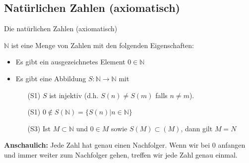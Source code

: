 \documentclass[12pt%
,aspectratio=169%
]{beamer}
\begin{document}
\subsection{Natürlichen Zahlen (axiomatisch)}
\begin{frame}{Die natürlichen Zahlen (axiomatisch)}
\begin{definition}
$\mathbb{N}$ ist eine Menge von Zahlen mit den folgenden Eigenschaften:
\begin{itemize}
	\item Es gibt ein ausgezeichnetes Element $0 \in \mathbb{N}$
	\item Es gibt eine Abbildung $S : \mathbb{N} \to \mathbb{N}$ mit
	\begin{itemize}
		\item[(S1)] $S$ ist injektiv (d.h. $S(n) \neq  S(m)$ falls $n \neq m$).
		\item[(S1)] $0 \not \in S(\mathbb{N}) = \{S(n) | n \in \mathbb{N}\}$
		\item[(S3)] Ist $M \subset \mathbb{N}$ und $0 \in M$ sowie $S(M) \subset (M)$, dann gilt $M = N$
	\end{itemize}
\end{itemize}
\end{definition}
\textbf{Anschaulich:} Jede Zahl hat genau einen Nachfolger. Wenn wir bei $0$ anfangen und immer weiter zum Nachfolger gehen, treffen wir jede Zahl genau einmal.
\end{frame}
\end{document}
